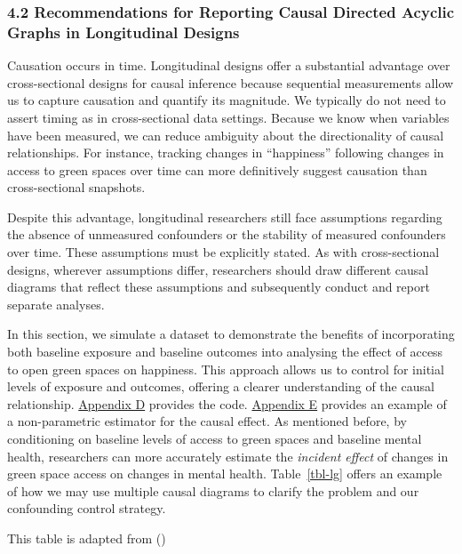 \documentclass[
  single column]{article}
\begin{document}
\subsubsection{4.2 Recommendations for Reporting Causal Directed Acyclic
Graphs in Longitudinal
Designs}\label{recommendations-for-reporting-causal-directed-acyclic-graphs-in-longitudinal-designs}

Causation occurs in time. Longitudinal designs offer a substantial
advantage over cross-sectional designs for causal inference because
sequential measurements allow us to capture causation and quantify its
magnitude. We typically do not need to assert timing as in
cross-sectional data settings. Because we know when variables have been
measured, we can reduce ambiguity about the directionality of causal
relationships. For instance, tracking changes in ``happiness'' following
changes in access to green spaces over time can more definitively
suggest causation than cross-sectional snapshots.

Despite this advantage, longitudinal researchers still face assumptions
regarding the absence of unmeasured confounders or the stability of
measured confounders over time. These assumptions must be explicitly
stated. As with cross-sectional designs, wherever assumptions differ,
researchers should draw different causal diagrams that reflect these
assumptions and subsequently conduct and report separate analyses.

In this section, we simulate a dataset to demonstrate the benefits of
incorporating both baseline exposure and baseline outcomes into
analysing the effect of access to open green spaces on happiness. This
approach allows us to control for initial levels of exposure and
outcomes, offering a clearer understanding of the causal relationship.
\hyperref[appendix-d-simulation-of-different-confounding-control-strategies]{Appendix
D} provides the code.
\hyperref[appendix-e-non-parametric-estimation-of-average-treatment-effects-using-causal-forests]{Appendix
E} provides an example of a non-parametric estimator for the causal
effect. As mentioned before, by conditioning on baseline levels of
access to green spaces and baseline mental health, researchers can more
accurately estimate the \emph{incident effect} of changes in green space
access on changes in mental health. Table~\ref{tbl-lg} offers an example
of how we may use multiple causal diagrams to clarify the problem and
our confounding control strategy.

\begin{table}

\caption{\label{tbl-lg}This table is adapted from
()}

\centering{

\examplelongitudinal

}

\end{table}%
\end{document}
